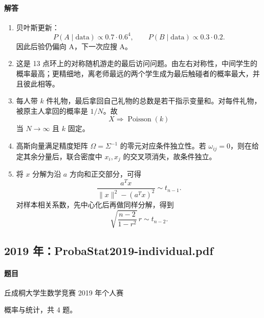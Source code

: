 \documentclass[UTF8,12pt]{ctexart}
\begin{document}
\paragraph{解答}
\begin{enumerate}[label=\textbf{\arabic*.},leftmargin=2.2em]
\item 贝叶斯更新：
\[
P(A\mid \text{data})\propto 0.7\cdot 0.6^4,\qquad
P(B\mid \text{data})\propto 0.3\cdot 0.2.
\]
因此后验仍偏向 A，下一次应搜 A。
\item 这是 13 点环上的对称随机游走的最后访问问题。由左右对称性，中间学生的概率最高；更精细地，离老师最远的两个学生成为最后触碰者的概率最大，并且彼此相等。
\item 每人带 \(k\) 件礼物，最后拿回自己礼物的总数是若干指示变量和。对每件礼物，被原主人拿回的概率是 \(1/N\)。故
\[
X\Rightarrow \operatorname{Poisson}(k)
\]
当 \(N\to\infty\) 且 \(k\) 固定。
\item 高斯向量满足精度矩阵 \(\Omega=\Sigma^{-1}\) 的零元对应条件独立性。若 \(\omega_{ij}=0\)，则在给定其余分量后，联合密度中 \(x_i,x_j\) 的交叉项消失，故条件独立。
\item 将 \(x\) 分解为沿 \(a\) 方向和正交部分，可得
\[
\frac{a^Tx}{\|x\|^2-(a^Tx)^2}\sim t_{n-1}.
\]
对样本相关系数，先中心化后再做同样分解，得到
\[
\sqrt{\frac{n-2}{1-r^2}}\,r\sim t_{n-2}.
\]
\end{enumerate}

\subsection{2019 年：ProbaStat2019-individual.pdf}
\paragraph{题目}
丘成桐大学生数学竞赛 2019 年个人赛

概率与统计，共 4 题。
\end{document}
